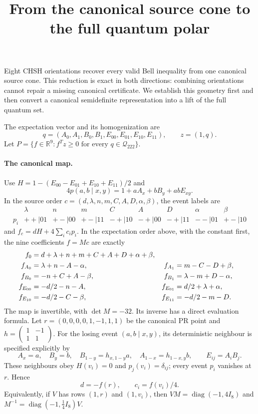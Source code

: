 \documentclass[11pt]{article}
\title{From the canonical source cone to the full quantum polar}
\author{}\date{}
\newcommand{\R}{\mathbb R}
\begin{document}
\maketitle\vspace{-2em}

Eight CHSH orientations recover every valid Bell inequality from one
canonical source cone. This reduction is exact in both directions:
combining orientations cannot repair a missing canonical certificate.
We establish this geometry first and then convert a canonical semidefinite
representation into a lift of the full quantum set.

The expectation vector and its homogenization are
\[
 q=(A_0,A_1,B_0,B_1,E_{00},E_{01},E_{10},E_{11}),\qquad z=(1,q).
\]
Let $P=\{f\in\R^9:f^Tz\ge0\text{ for every }q\in\mathcal Q_{222}\}$.

\paragraph{The canonical map.}
Use $H=1-(E_{00}-E_{01}+E_{10}+E_{11})/2$ and
\[
 4p(a,b\mid x,y)=1+aA_x+bB_y+abE_{xy}.
\]
In the source order $c=(d,\lambda,n,m,C,A,D,\alpha,\beta)$, the event
labels are
\[
\begin{array}{c|cccccccc}
 &\lambda&n&m&C&A&D&\alpha&\beta\\\hline
 p_i&++|01&+-|00&+-|11&-+|10&-+|00&-+|11&--|01&+-|10
\end{array}
\]
and $f_c=dH+4\sum_i c_i p_i$. In the expectation order above, with
the constant first, the nine coefficients $f=Mc$ are exactly
\begin{align}
 f_0&=d+\lambda+n+m+C+A+D+\alpha+\beta,\notag\\
 f_{A_0}&=\lambda+n-A-\alpha,&
 f_{A_1}&=m-C-D+\beta,\notag\\
 f_{B_0}&=-n+C+A-\beta,&
 f_{B_1}&=\lambda-m+D-\alpha,\notag\\
 f_{E_{00}}&=-d/2-n-A,& f_{E_{01}}&=d/2+\lambda+\alpha,\notag\\
 f_{E_{10}}&=-d/2-C-\beta,& f_{E_{11}}&=-d/2-m-D.
                                                               \label{eq:map}
\end{align}
The map is invertible, with $\det M=-32$. Its inverse has a direct
evaluation formula. Let
$r=(0,0,0,0,1,-1,1,1)$ be the canonical PR point and
$h=\left(\begin{smallmatrix}1&-1\\1&1\end{smallmatrix}\right)$.
For the losing event $(a,b\mid x,y)$, its deterministic neighbour is
specified explicitly by
\[
 A_x=a,\quad B_y=b,\quad
 B_{1-y}=h_{x,1-y}a,\quad A_{1-x}=h_{1-x,y}b,
 \qquad E_{ij}=A_iB_j.
\]
These neighbours obey $H(v_i)=0$ and $p_j(v_i)=\delta_{ij}$;
every event $p_i$ vanishes at $r$. Hence
\begin{equation}
 d=-f(r),\qquad c_i=f(v_i)/4.                            \label{eq:inverse}
\end{equation}
Equivalently, if $V$ has rows $(1,r)$ and $(1,v_i)$, then
$VM=\operatorname{diag}(-1,4I_8)$ and
$M^{-1}=\operatorname{diag}(-1,\tfrac14 I_8)V$.
\end{document}
